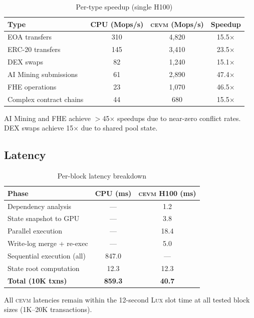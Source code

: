\documentclass[11pt,letterpaper]{article}
\theoremstyle{definition}
\theoremstyle{remark}
\newcommand{\cevm}{\textsc{cevm}}
\newcommand{\Lux}{\textsc{Lux}}
\begin{document}
\begin{table}[h]
\centering
\begin{tabular}{lccc}
\toprule
\textbf{Type} & \textbf{CPU (Mops/s)} & \textbf{\cevm{} (Mops/s)} & \textbf{Speedup} \\
\midrule
EOA transfers & 310 & 4,820 & 15.5$\times$ \\
ERC-20 transfers & 145 & 3,410 & 23.5$\times$ \\
DEX swaps & 82 & 1,240 & 15.1$\times$ \\
AI Mining submissions & 61 & 2,890 & 47.4$\times$ \\
FHE operations & 23 & 1,070 & 46.5$\times$ \\
Complex contract chains & 44 & 680 & 15.5$\times$ \\
\bottomrule
\end{tabular}
\caption{Per-type speedup (single H100)}
\label{tab:type-speedup}
\end{table}

AI Mining and FHE achieve $>$45$\times$ speedups due to near-zero conflict rates.
DEX swaps achieve 15$\times$ due to shared pool state.

\subsection{Latency}

\begin{table}[h]
\centering
\begin{tabular}{lcc}
\toprule
\textbf{Phase} & \textbf{CPU (ms)} & \textbf{\cevm{} H100 (ms)} \\
\midrule
Dependency analysis & --- & 1.2 \\
State snapshot to GPU & --- & 3.8 \\
Parallel execution & --- & 18.4 \\
Write-log merge + re-exec & --- & 5.0 \\
Sequential execution (all) & 847.0 & --- \\
State root computation & 12.3 & 12.3 \\
\midrule
\textbf{Total (10K txns)} & \textbf{859.3} & \textbf{40.7} \\
\bottomrule
\end{tabular}
\caption{Per-block latency breakdown}
\label{tab:latency}
\end{table}

All \cevm{} latencies remain within the 12-second \Lux{} slot time at all tested block sizes (1K--20K transactions).
\end{document}
